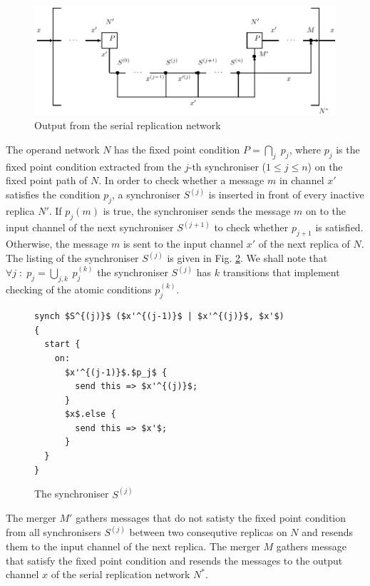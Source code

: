 \begin{figure}[h!]
\centering
\includegraphics[scale=0.8]{figs/chapter_04_ffp_out.pdf}
\caption{Output from the serial replication network}
\label{fig:ffp_out}
\end{figure}

The operand network $N$ has the fixed point condition $P = \underset{j}{\bigcap} \; p_j$, where $p_j$ is the fixed point condition extracted from the $j$-th synchroniser ($1 \leq j \leq n$) on the fixed point path of $N$. In order to check whether a message $m$ in channel $x'$ satisfies the condition $p_j$, a synchroniser $S^{(j)}$ is inserted in front of every inactive replica $N'$. If $p_{j}(m)$ is true, the synchroniser sends the message $m$ on to the input channel of the next synchroniser $S^{(j+1)}$ to check whether $p_{j+1}$ is satisfied. Otherwise, the message $m$ is sent to the input channel $x'$ of the next replica of $N$. The listing of the synchroniser $S^{(j)}$ is given in Fig. \ref{ffp:synch_filt}. We shall note that $\forall j \;:\; p_j = \underset{j,k}{\bigcup} \: p^{(k)}_j$ the synchroniser $S^{(j)}$ has $k$ transitions that implement checking of the atomic conditions $p^{(k)}_j$.
\begin{figure}[h!]
\begin{lstlisting}[frame=single,mathescape]
synch $S^{(j)}$ ($x'^{(j-1)}$ | $x'^{(j)}$, $x'$)
{
  start {
    on:
      $x'^{(j-1)}$.$p_j$ {
        send this => $x'^{(j)}$;
      }
      $x$.else {
        send this => $x'$;
      }
  }
}
\end{lstlisting}
\caption{The synchroniser $S^{(j)}$}
\label{ffp:synch_filt}
\end{figure}

The merger $M'$ gathers messages that do not satisty the fixed point condition from all synchronisers $S^{(j)}$ between two consequtive replicas on $N$ and resends them to the input channel of the next replica. The merger $M$ gathers message that satisfy the fixed point condition and resends the messages to the output channel $x$ of the serial replication network $N^{*}$.

